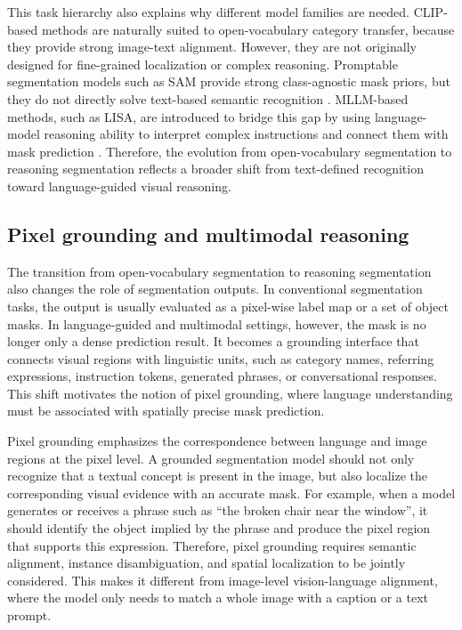 This task hierarchy also explains why different model families are needed. 
CLIP-based methods are naturally suited to open-vocabulary category transfer, because they provide strong image-text alignment. 
However, they are not originally designed for fine-grained localization or complex reasoning. 
Promptable segmentation models such as SAM provide strong class-agnostic mask priors, but they do not directly solve text-based semantic recognition \cite{Kirillov2023}. 
MLLM-based methods, such as LISA, are introduced to bridge this gap by using language-model reasoning ability to interpret complex instructions and connect them with mask prediction \cite{Lai2024}. 
Therefore, the evolution from open-vocabulary segmentation to reasoning segmentation reflects a broader shift from text-defined recognition toward language-guided visual reasoning.

\subsection{Pixel grounding and multimodal reasoning}
\label{subsec:pixel_grounding}

The transition from open-vocabulary segmentation to reasoning segmentation also changes the role of segmentation outputs. 
In conventional segmentation tasks, the output is usually evaluated as a pixel-wise label map or a set of object masks. 
In language-guided and multimodal settings, however, the mask is no longer only a dense prediction result. 
It becomes a grounding interface that connects visual regions with linguistic units, such as category names, referring expressions, instruction tokens, generated phrases, or conversational responses. 
This shift motivates the notion of pixel grounding, where language understanding must be associated with spatially precise mask prediction.

Pixel grounding emphasizes the correspondence between language and image regions at the pixel level. 
A grounded segmentation model should not only recognize that a textual concept is present in the image, but also localize the corresponding visual evidence with an accurate mask. 
For example, when a model generates or receives a phrase such as ``the broken chair near the window'', it should identify the object implied by the phrase and produce the pixel region that supports this expression. 
Therefore, pixel grounding requires semantic alignment, instance disambiguation, and spatial localization to be jointly considered. 
This makes it different from image-level vision-language alignment, where the model only needs to match a whole image with a caption or a text prompt.

